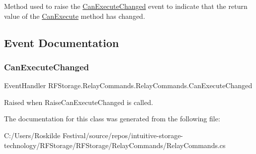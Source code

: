 Method used to raise the \mbox{\hyperlink{class_r_f_storage_1_1_relay_commands_1_1_relay_commands_a7ad91fe956842b7f151d01ee787d38c0}{Can\+Execute\+Changed}} event to indicate that the return value of the \mbox{\hyperlink{class_r_f_storage_1_1_relay_commands_1_1_relay_commands_a65a37e91e18d693a8445d4b6e34e1ce6}{Can\+Execute}} method has changed. 



\subsection{Event Documentation}
\mbox{\label{class_r_f_storage_1_1_relay_commands_1_1_relay_commands_a7ad91fe956842b7f151d01ee787d38c0}} 
\subsubsection{\texorpdfstring{CanExecuteChanged}{CanExecuteChanged}}
{\footnotesize\ttfamily Event\+Handler R\+F\+Storage.\+Relay\+Commands.\+Relay\+Commands.\+Can\+Execute\+Changed}



Raised when Raise\+Can\+Execute\+Changed is called. 



The documentation for this class was generated from the following file\+:\begin{DoxyCompactItemize}
\item 
C\+:/\+Users/\+Roskilde Festival/source/repos/intuitive-\/storage-\/technology/\+R\+F\+Storage/\+R\+F\+Storage/\+Relay\+Commands/Relay\+Commands.\+cs\end{DoxyCompactItemize}
